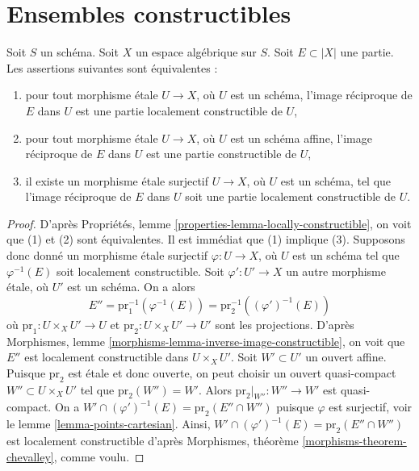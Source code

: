 \section{Ensembles constructibles}
\label{section-constructible}

\begin{lemma}
\label{lemma-locally-constructible}
Soit $S$ un schéma. Soit $X$ un espace algébrique sur $S$.
Soit $E \subset |X|$ une partie. Les assertions suivantes sont équivalentes :
\begin{enumerate}
\item pour tout morphisme \'etale $U \to X$, où $U$ est un
schéma, l'image réciproque de $E$ dans $U$ est une partie localement constructible
de $U$,
\item pour tout morphisme \'etale $U \to X$, où $U$ est un
schéma affine, l'image réciproque de $E$ dans $U$ est une partie constructible
de $U$,
\item il existe un morphisme \'etale surjectif $U \to X$, où $U$ est un
schéma, tel que l'image réciproque de $E$ dans $U$ soit une partie localement constructible
de $U$.
\end{enumerate}
\end{lemma}

\begin{proof}
D'après Propriétés, lemme \ref{properties-lemma-locally-constructible},
on voit que (1) et (2) sont équivalentes. Il est immédiat que (1)
implique (3). Supposons donc donné un morphisme \'etale surjectif
$\varphi : U \to X$, où $U$ est un schéma tel que $\varphi^{-1}(E)$
soit localement constructible. Soit $\varphi' : U' \to X$ un autre
morphisme \'etale, où $U'$ est un schéma. On a alors
$$
E'' = \text{pr}_1^{-1}(\varphi^{-1}(E)) = \text{pr}_2^{-1}((\varphi')^{-1}(E))
$$
où $\text{pr}_1 : U \times_X U' \to U$ et
$\text{pr}_2 : U \times_X U' \to U'$ sont les projections.
D'après Morphismes, lemme \ref{morphisms-lemma-inverse-image-constructible},
on voit que $E''$ est localement constructible dans $U \times_X U'$.
Soit $W' \subset U'$ un ouvert affine. Puisque $\text{pr}_2$ est
\'etale et donc ouverte, on peut choisir un ouvert quasi-compact
$W'' \subset U \times_X U'$ tel que $\text{pr}_2(W'') = W'$.
Alors $\text{pr}_2|_{W''} : W'' \to W'$ est quasi-compact.
On a $W' \cap (\varphi')^{-1}(E) = \text{pr}_2(E'' \cap W'')$
puisque $\varphi$ est surjectif, voir le lemme \ref{lemma-points-cartesian}.
Ainsi, $W' \cap (\varphi')^{-1}(E) = \text{pr}_2(E'' \cap W'')$
est localement constructible d'après
Morphismes, théorème \ref{morphisms-theorem-chevalley}, comme voulu.
\end{proof}


